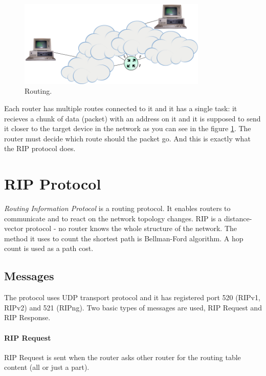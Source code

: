 \documentclass[10pt,a4paper,titlepage]{article}
\begin{document}
            \begin{figure}[h!]
                \begin{center}
                    \includegraphics[width=0.80\textwidth]{routing.png}
                    \caption{ Routing. \label{fig:routing} \cite{Cloudimage} \cite{PCimage}}
                \end{center}
            \end{figure}

            Each router has multiple routes connected to it and it has a single task: it recieves
            a chunk of data (packet) with an address on it and it is supposed to send it closer to
            the target device in the network as you can see in the figure \ref{fig:routing}.
            The router must decide which route should the packet go. And this is exactly what the
            RIP protocol does. 
    



    \section{RIP Protocol}
        {\it Routing Information Protocol} is a routing protocol. It enables routers to communicate and to react
        on the network topology changes. RIP is a distance-vector protocol - no router knows the whole structure
        of the network. The method it uses to count the shortest path is Bellman-Ford algorithm. A hop count
        is used as a path cost.


        \subsection{Messages}
            The protocol uses UDP transport protocol and it has registered port 520 (RIPv1, RIPv2) and 521 (RIPng).
            Two basic types of messages are used, RIP Request and RIP Response.
            \paragraph{RIP Request}
                RIP Request is sent when the router asks other router for the routing table content (all or just a part).
\end{document}
